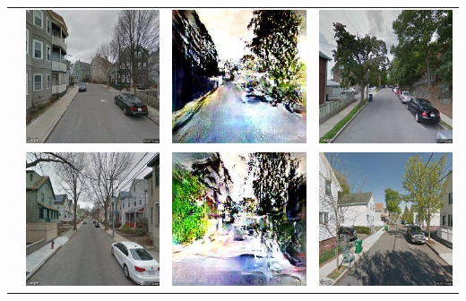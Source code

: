 \begin{table}
\begin{tabular}{l*3{C}@{}}
        & \includegraphics[width=11em]{u_5.jpeg} & \includegraphics[width=11em]{t_5.jpeg} &  \includegraphics[width=11em]{b_5.jpeg} \\ 
        & \includegraphics[width=11em]{u_7.jpeg} & \includegraphics[width=11em]{t_7.jpeg} &  \includegraphics[width=11em]{b_7.jpeg} \\ 

\end{tabular}
\end{table}

